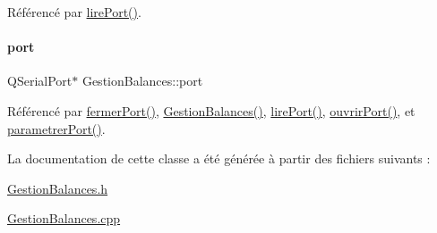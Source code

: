Référencé par \hyperlink{class_gestion_balances_a4f3f6a424fce484321d239fa9f7fa15f}{lire\+Port()}.

\mbox{\label{class_gestion_balances_a7e40205180eb65dab0b5cdebd628f794}} 
\paragraph{\texorpdfstring{port}{port}}
{\footnotesize\ttfamily Q\+Serial\+Port$\ast$ Gestion\+Balances\+::port\hspace{0.3cm}{\ttfamily [private]}}



Référencé par \hyperlink{class_gestion_balances_a4c59a33f55b0c97f0ea4fb63b7791c0c}{fermer\+Port()}, \hyperlink{class_gestion_balances_a68f1e2d248971ff912f4ce5e2a24b6ef}{Gestion\+Balances()}, \hyperlink{class_gestion_balances_a4f3f6a424fce484321d239fa9f7fa15f}{lire\+Port()}, \hyperlink{class_gestion_balances_a8d7031310e6b9530c0a9e47c142aaf39}{ouvrir\+Port()}, et \hyperlink{class_gestion_balances_aca48b0074aaef7b8d4d9da45c3d6a3a9}{parametrer\+Port()}.



La documentation de cette classe a été générée à partir des fichiers suivants \+:\begin{DoxyCompactItemize}
\item 
\hyperlink{_gestion_balances_8h}{Gestion\+Balances.\+h}\item 
\hyperlink{_gestion_balances_8cpp}{Gestion\+Balances.\+cpp}\end{DoxyCompactItemize}
